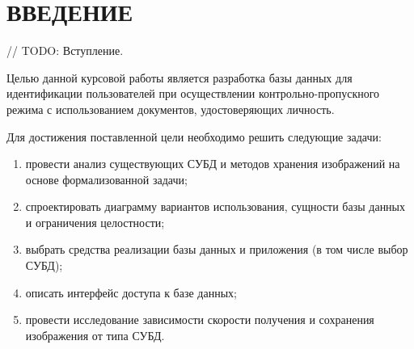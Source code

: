 \chapter*{ВВЕДЕНИЕ}

// TODO: Вступление.

Целью данной курсовой работы является разработка базы данных для идентификации пользователей при осуществлении контрольно-пропускного режима с использованием документов, удостоверяющих личность.

Для достижения поставленной цели необходимо решить следующие задачи:
\begin{enumerate}
	\item провести анализ существующих СУБД и методов хранения изображений на основе формализованной задачи;
	\item спроектировать диаграмму вариантов использования, сущности базы данных и ограничения целостности;
	\item выбрать средства реализации базы данных и приложения (в том числе выбор СУБД);
	\item описать интерфейс доступа к базе данных;
	\item провести исследование зависимости скорости получения и сохранения изображения от типа СУБД.
\end{enumerate}